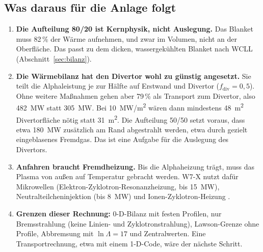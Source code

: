 \subsection{Was daraus für die Anlage folgt}
\begin{enumerate}
\item \textbf{Die Aufteilung 80/20 ist Kernphysik, nicht Auslegung.} Das Blanket muss 82\,\% der Wärme aufnehmen, und
  zwar im Volumen, nicht an der Oberfläche. Das passt zu dem dicken, wassergekühlten Blanket nach WCLL
  (Abschnitt~\ref{sec:bilanz}).
\item \textbf{Die Wärmebilanz hat den Divertor wohl zu günstig angesetzt.} Sie teilt die Alphaleistung je zur Hälfte
  auf Erstwand und Divertor ($f_\mathrm{div} = 0{,}5$). Ohne weitere Maßnahmen gehen aber 79\,\% als Transport zum
  Divertor, also \SI{482}{MW} statt \SI{305}{MW}. Bei \SI{10}{MW/m^2} wären dann mindestens \SI{48}{m^2}
  Divertorfläche nötig statt \SI{31}{m^2}. Die Aufteilung 50/50 setzt voraus, dass etwa \SI{180}{MW} zusätzlich am
  Rand abgestrahlt werden, etwa durch gezielt eingeblasenes Fremdgas. Das ist eine Aufgabe für die Auslegung des
  Divertors.
\item \textbf{Anfahren braucht Fremdheizung.} Bis die Alphaheizung trägt, muss das Plasma von außen auf Temperatur
  gebracht werden. W7-X nutzt dafür Mikrowellen (Elektron-Zyklotron-Resonanzheizung, bis \SI{15}{MW}),
  Neutralteilcheninjektion (bis \SI{8}{MW}) und Ionen-Zyklotron-Heizung \cite{wiki_w7x}.
\item \textbf{Grenzen dieser Rechnung:} 0-D-Bilanz mit festen Profilen, nur Bremsstrahlung (keine Linien- und
  Zyklotronstrahlung), Lawson-Grenze ohne Profile, Abbremsung mit $\ln\Lambda = 17$ und Zentralwerten. Eine
  Transportrechnung, etwa mit einem 1-D-Code, wäre der nächste Schritt.
\end{enumerate}
